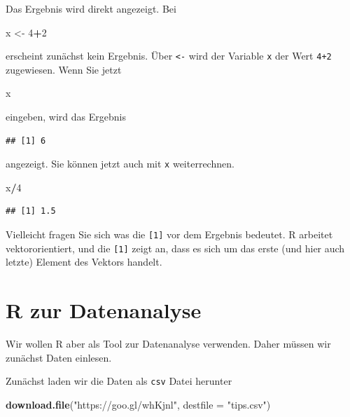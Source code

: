 \documentclass[12pt,ngerman,paper=a4,pagesize,DIV=13]{scrreprt}
\newenvironment{Shaded}{\begin{snugshade}}{\end{snugshade}}
\newcommand{\DataTypeTok}[1]{\textcolor[rgb]{0.13,0.29,0.53}{#1}}
\newcommand{\DecValTok}[1]{\textcolor[rgb]{0.00,0.00,0.81}{#1}}
\newcommand{\KeywordTok}[1]{\textcolor[rgb]{0.13,0.29,0.53}{\textbf{#1}}}
\newcommand{\NormalTok}[1]{#1}
\newcommand{\OperatorTok}[1]{\textcolor[rgb]{0.81,0.36,0.00}{\textbf{#1}}}
\newcommand{\StringTok}[1]{\textcolor[rgb]{0.31,0.60,0.02}{#1}}
\begin{document}
Das Ergebnis wird direkt angezeigt. Bei

\begin{Shaded}
\begin{Highlighting}[]
\NormalTok{x <-}\StringTok{ }\DecValTok{4}\OperatorTok{+}\DecValTok{2}
\end{Highlighting}
\end{Shaded}

erscheint zunächst kein Ergebnis. Über \texttt{\textless{}-} wird der
Variable \texttt{x} der Wert \texttt{4+2} zugewiesen. Wenn Sie jetzt

\begin{Shaded}
\begin{Highlighting}[]
\NormalTok{x}
\end{Highlighting}
\end{Shaded}

eingeben, wird das Ergebnis

\begin{verbatim}
## [1] 6
\end{verbatim}

angezeigt. Sie können jetzt auch mit \texttt{x} weiterrechnen.

\begin{Shaded}
\begin{Highlighting}[]
\NormalTok{x}\OperatorTok{/}\DecValTok{4}
\end{Highlighting}
\end{Shaded}

\begin{verbatim}
## [1] 1.5
\end{verbatim}

Vielleicht fragen Sie sich was die \texttt{{[}1{]}} vor dem Ergebnis
bedeutet. R arbeitet vektororientiert, und die \texttt{{[}1{]}} zeigt
an, dass es sich um das erste (und hier auch letzte) Element des Vektors
handelt.

\hypertarget{r-zur-datenanalyse}{%
\section{R zur Datenanalyse}\label{r-zur-datenanalyse}}

Wir wollen R aber als Tool zur Datenanalyse verwenden. Daher müssen wir
zunächst Daten einlesen.

Zunächst laden wir die Daten als \texttt{csv} Datei herunter

\begin{Shaded}
\begin{Highlighting}[]
\KeywordTok{download.file}\NormalTok{(}\StringTok{"https://goo.gl/whKjnl"}\NormalTok{, }\DataTypeTok{destfile =} \StringTok{"tips.csv"}\NormalTok{)}
\end{Highlighting}
\end{Shaded}
\end{document}
